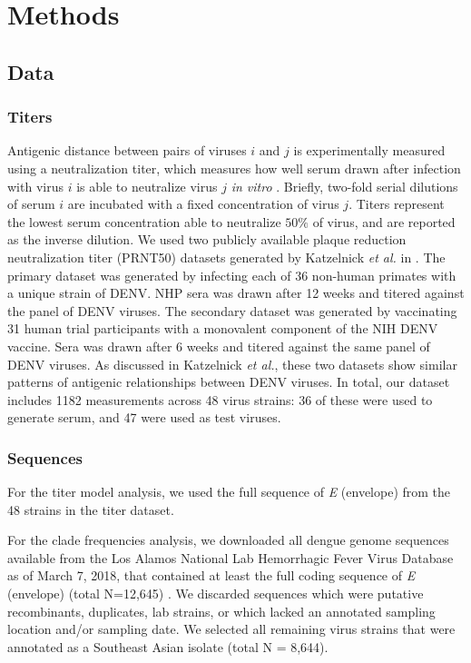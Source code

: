\documentclass[11pt,oneside,letterpaper]{article}
\begin{document}
\newpage

\section*{Methods}
\subsection*{Data}

\subsubsection*{Titers}
Antigenic distance between pairs of viruses $i$ and $j$ is experimentally measured using a neutralization titer, which measures how well serum drawn after infection with virus $i$ is able to neutralize virus $j$ \textit{in vitro} \citep{russell1967dengue}.
Briefly, two-fold serial dilutions of serum $i$ are incubated with a fixed concentration of virus $j$.
Titers represent the lowest serum concentration able to neutralize $50\%$ of virus, and are reported as the inverse dilution.
We used two publicly available plaque reduction neutralization titer (PRNT50) datasets generated by Katzelnick \textit{et al.} in \citep{katzelnick2015dengue}.
The primary dataset was generated by infecting each of 36 non-human primates with a unique strain of DENV.
NHP sera was drawn after 12 weeks and titered against the panel of DENV viruses.
The secondary dataset was generated by vaccinating 31 human trial participants with a monovalent component of the NIH DENV vaccine.
Sera was drawn after 6 weeks and titered against the same panel of DENV viruses.
As discussed in Katzelnick \textit{et al.}, these two datasets show similar patterns of antigenic relationships between DENV viruses.
In total, our dataset includes 1182 measurements across 48 virus strains: 36 of these were used to generate serum, and 47 were used as test viruses.

\subsubsection*{Sequences}
For the titer model analysis, we used the full sequence of \textit{E} (envelope) from the 48 strains in the titer dataset.

For the clade frequencies analysis, we downloaded all dengue genome sequences available from the Los Alamos National Lab Hemorrhagic Fever Virus Database as of March 7, 2018, that contained at least the full coding sequence of \textit{E} (envelope) (total N=12,645) \citep{kuiken2011lanl}.
We discarded sequences which were putative recombinants, duplicates, lab strains, or which lacked an annotated sampling location and/or sampling date.
We selected all remaining virus strains that were annotated as a Southeast Asian isolate (total N = 8,644).
\end{document}
